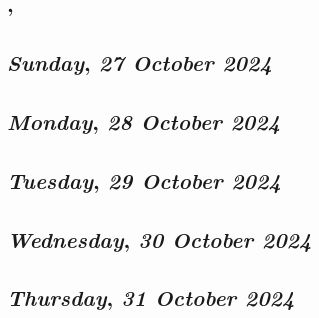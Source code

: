 \subsection*{\weekday, \day}

\def\day{\textit{27 October 2024}}
\def\weekday{\textit{Sunday}}
\subsection*{\weekday, \day}

\def\day{\textit{28 October 2024}}
\def\weekday{\textit{Monday}}
\subsection*{\weekday, \day}

\def\day{\textit{29 October 2024}}
\def\weekday{\textit{Tuesday}}
\subsection*{\weekday, \day}

\def\day{\textit{30 October 2024}}
\def\weekday{\textit{Wednesday}}
\subsection*{\weekday, \day}

\def\day{\textit{31 October 2024}}
\def\weekday{\textit{Thursday}}
\subsection*{\weekday, \day}

